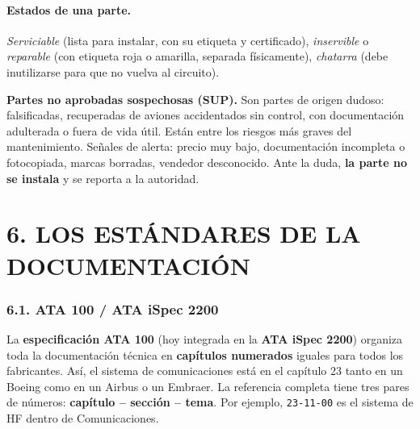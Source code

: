 \paragraph*{Estados de una parte.} \textit{Serviciable} (lista para instalar, con su etiqueta y
certificado), \textit{inservible} o \textit{reparable} (con etiqueta roja o amarilla, separada
físicamente), \textit{chatarra} (debe inutilizarse para que no vuelva al circuito).

\begin{recuadro}
\textbf{Partes no aprobadas sospechosas (SUP).} Son partes de origen dudoso: falsificadas,
recuperadas de aviones accidentados sin control, con documentación adulterada o fuera de vida
útil. Están entre los riesgos más graves del mantenimiento. Señales de alerta: precio muy bajo,
documentación incompleta o fotocopiada, marcas borradas, vendedor desconocido. Ante la duda,
\textbf{la parte no se instala} y se reporta a la autoridad.
\end{recuadro}

\section*{6. LOS ESTÁNDARES DE LA DOCUMENTACIÓN}

\subsubsection*{6.1. ATA 100 / ATA iSpec 2200}
La \textbf{especificación ATA 100} (hoy integrada en la \textbf{ATA iSpec 2200}) organiza toda la
documentación técnica en \textbf{capítulos numerados} iguales para todos los fabricantes. Así, el
sistema de comunicaciones está en el capítulo 23 tanto en un Boeing como en un Airbus o un
Embraer. La referencia completa tiene tres pares de números: \textbf{capítulo -- sección -- tema}.
Por ejemplo, \texttt{23-11-00} es el sistema de HF dentro de Comunicaciones.

